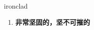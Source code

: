 
\begin{frame}
{\huge ironclad}
\begin{center}
\begin{enumerate}\Large
  \item \textbf{非常坚固的，坚不可摧的}
\end{enumerate}
\end{center}
\end{frame}
